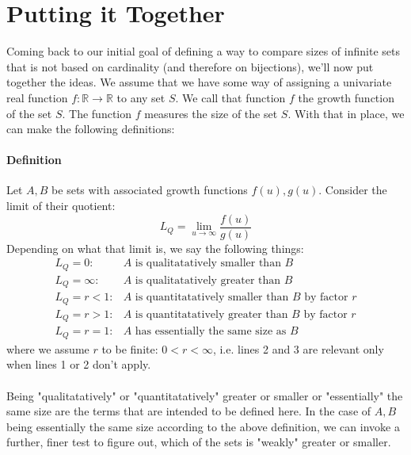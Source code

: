 \documentclass[12pt]{article}
\begin{document}



\section{Putting it Together}
Coming back to our initial goal of defining a way to compare sizes of infinite sets that is not based on cardinality (and therefore on bijections), we'll now put together the ideas. We assume that we have some way of assigning a univariate real function $f: \mathbb{R} \rightarrow \mathbb{R}$ to any set $S$. We call that function $f$ the growth function of the set $S$. The function $f$ measures the size of the set $S$.  With that in place, we can make the following definitions:

\paragraph{Definition}
Let $A,B$ be sets with associated growth functions $f(u), g(u)$. Consider the limit of their quotient:
\begin{equation}
 L_Q = \lim_{u \rightarrow \infty}	\frac{f(u)}{g(u)}
\end{equation}
Depending on what that limit is, we say the following things:
\begin{eqnarray}
 L_Q = 0:         &  A \text{ is qualitatatively smaller than } B \\
 L_Q = \infty:    &  A \text{ is qualitatatively greater than } B \\
 L_Q = r < 1:     &  A \text{ is quantitatatively smaller than } B \text{ by factor } r \\
 L_Q = r > 1:     &  A \text{ is quantitatatively greater than } B \text{ by factor } r \\
 L_Q = r = 1:     &  A \text{ has essentially the same size as } B
\end{eqnarray}
where we assume $r$ to be finite: $0 < r < \infty$, i.e. lines 2 and 3 are relevant only when lines 1 or 2 don't apply.

\paragraph{}
Being "qualitatatively" or "quantitatatively" greater or smaller or "essentially" the same size are the terms that are intended to be defined here. In the case of $A,B$ being essentially the same size according to the above definition, we can invoke a further, finer test to figure out, which of the sets is "weakly" greater or smaller.
\end{document}
